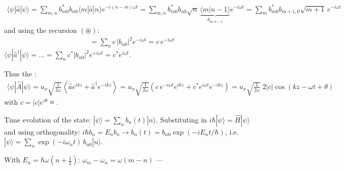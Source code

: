\documentclass[letterpaper,10pt,english]{jupyterBook}
\begin{document}
\sphinxAtStartPar
{}

\sphinxAtStartPar
{}
\begin{equation*}
\begin{split}
\langle\psi|\hat a|\psi\rangle=\sum_{m,n}b^*_{m0}b_{n0}\langle m|\hat a|n\rangle e^{-i(n-m)\omega t}
=\sum_{m,n}b^*_{m0}b_{n0}\sqrt n\,\underbrace{\langle m|n-1\rangle}_{\delta_{m,n-1}}e^{-i\omega t}
=\sum_m b^*_{m0}b_{m+1,0}\sqrt{m+1}\,e^{-i\omega t}
\end{split}
\end{equation*}
\sphinxAtStartPar
and using the recursion \((\circledast)\):
\begin{equation*}
\begin{split}
=\sum_n c\,|b_{n0}|^2e^{-i\omega t}=c\,e^{-i\omega t}
\end{split}
\end{equation*}
\sphinxAtStartPar
{} \(\langle\psi|\hat a^\dagger|\psi\rangle=\dots=\sum_nc^*|b_{n0}|^2e^{+i\omega t}=c^*e^{i\omega t}\).

\sphinxAtStartPar
Thus the :
\begin{equation*}
\begin{split}
\langle\psi|\hat A|\psi\rangle=u_x\sqrt{\tfrac1{2\omega}}\left\langle\hat a e^{ikz}+\hat a^\dagger e^{-ikz}\right\rangle
=u_x\sqrt{\tfrac1{2\omega}}\left(c\,e^{-i\omega t}e^{ikz}+c^*e^{i\omega t}e^{-ikz}\right)
=u_x\sqrt{\tfrac1{2\omega}}\;2|c|\cos(kz-\omega t+\theta)
\end{split}
\end{equation*}
\sphinxAtStartPar
with \(c=|c|e^{i\theta}\) ≈ .

\sphinxAtStartPar
{} Time evolution of the state: \(|\psi\rangle=\sum_nb_n(t)|n\rangle\). Substituting in \(i\hbar|\dot\psi\rangle=\hat H|\psi\rangle\) and using orthogonality: \(i\hbar\dot b_n=E_nb_n\to b_n(t)=b_{n0}\exp(-iE_nt/\hbar)\), i.e. \(|\psi\rangle=\sum_n\exp(-i\omega_nt)\,b_{n0}|n\rangle\).

\sphinxAtStartPar
{} With \(E_n=\hbar\omega(n+\tfrac12)\): \(\omega_m-\omega_n=\omega(m-n)\) — 
\end{document}
